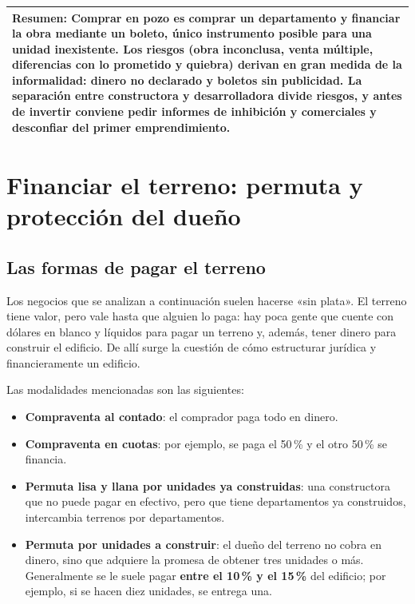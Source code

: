 \documentclass[12pt,oneside]{book}
\newcommand{\cornellresumen}[1]{%
  \multicolumn{2}{p{\dimexpr0.89\textwidth+2\tabcolsep\relax}}{\textbf{Resumen:} #1}\\}
\begin{document}
\begin{longtable}{p{}p{}}
\midrule
\cornellresumen{Comprar en pozo es comprar un departamento y financiar la obra mediante un boleto, único instrumento posible para una unidad inexistente. Los riesgos (obra inconclusa, venta múltiple, diferencias con lo prometido y quiebra) derivan en gran medida de la informalidad: dinero no declarado y boletos sin publicidad. La separación entre constructora y desarrolladora divide riesgos, y antes de invertir conviene pedir informes de inhibición y comerciales y desconfiar del primer emprendimiento.}
\bottomrule
\end{longtable}

\chapter[Financiación del terreno]{Financiar el terreno: permuta y protección del dueño}\label{cap:financiacion}

\section{Las formas de pagar el terreno}

Los negocios que se analizan a continuación suelen hacerse «sin plata». El terreno tiene valor, pero vale hasta que alguien lo paga: hay poca gente que cuente con dólares en blanco y líquidos para pagar un terreno y, además, tener dinero para construir el edificio. De allí surge la cuestión de cómo estructurar jurídica y financieramente un edificio.

Las modalidades mencionadas son las siguientes:

\begin{itemize}
    \item \textbf{Compraventa al contado}: el comprador paga todo en dinero.
    \item \textbf{Compraventa en cuotas}: por ejemplo, se paga el 50\,\% y el otro 50\,\% se financia.
    \item \textbf{Permuta lisa y llana por unidades ya construidas}: una constructora que no puede pagar en efectivo, pero que tiene departamentos ya construidos, intercambia terrenos por departamentos.
    \item \textbf{Permuta por unidades a construir}: el dueño del terreno no cobra en dinero, sino que adquiere la promesa de obtener tres unidades o más. Generalmente se le suele pagar \textbf{entre el 10\,\% y el 15\,\%} del edificio; por ejemplo, si se hacen diez unidades, se entrega una.
\end{itemize}
\end{document}
